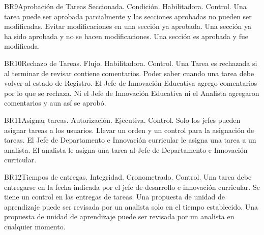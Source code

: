 \begin{BussinesRule}{BR9}{Aprobación de Tareas Seccionada.}
    \BRitem[Tipo:] Condición.
    \BRitem[Clase:] Habilitadora.
    \BRitem[Nivel:] Control.
    \BRitem[Descripción:]
    \BRitem[Sentencia:] Una tarea puede ser aprobada parcialmente y las secciones aprobadas no pueden ser modificadas.
    \BRitem[Motivación:] Evitar modificaciones en una sección ya aprobada.
     Una sección ya ha sido aprobada y no se hacen modificaciones.
     Una sección es aprobada y fue modificada.
\end{BussinesRule}
\begin{BussinesRule}{BR10}{Rechazo de Tareas.}
    \BRitem[Tipo:] Flujo.
    \BRitem[Clase:] Habilitadora.
    \BRitem[Nivel:] Control.
    \BRitem[Descripción:] Una Tarea es rechazada si al terminar de revisar contiene comentarios.
    \BRitem[Motivación:] Poder saber cuando una tarea debe volver al estado de Registro.
     El Jefe de Innovación Educativa agrego comentarios por lo que se rechaza.
     Ni el Jefe de Innovación Educativa ni el Analista agregaron comentarios y aun así se aprobó.
\end{BussinesRule}
\begin{BussinesRule}{BR11}{Asignar tareas.}
    \BRitem[Tipo:] Autorización.
    \BRitem[Clase:] Ejecutiva.
    \BRitem[Nivel:] Control.
    \BRitem[Descripción:] Solo los jefes pueden asignar tareas a los usuarios.
    \BRitem[Sentencia:]
    \BRitem[Motivación:] Llevar un orden y un control para la asignación de tareas.
     El Jefe de Departamento e Innovación curricular le asigna una tarea a un analista.
     El analista le asigna una tarea al Jefe de Departamento e Innovación curricular.
\end{BussinesRule}
\begin{BussinesRule}{BR12}{Tiempos de entregas.}
    \BRitem[Tipo:] Integridad.
    \BRitem[Clase:] Cronometrado.
    \BRitem[Nivel:] Control.
    \BRitem[Descripción:] Una tarea debe entregarse en la fecha indicada por el jefe de desarrollo e innovación curricular.
    \BRitem[Motivación:] Se tiene un control en las entregas de tareas.
     Una propuesta de unidad de aprendizaje puede ser revisada por un analista solo en el tiempo establecido.
     Una propuesta de unidad de aprendizaje puede ser revisada por un analista en cualquier momento.
\end{BussinesRule}
